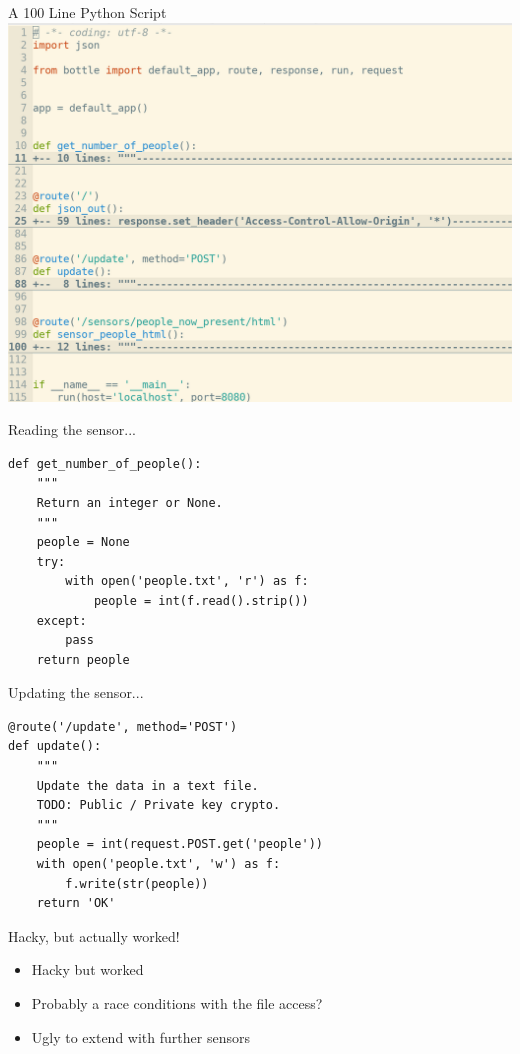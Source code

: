 \begin{frame}[c]{A 100 Line Python Script}
    \centering
    \includegraphics[height=0.98\textheight]{./spaceapi_in_rust/python2.png}
\end{frame}

\begin{frame}[fragile]{Reading the sensor...}
    \begin{verbatim}
def get_number_of_people():
    """
    Return an integer or None.
    """
    people = None
    try:
        with open('people.txt', 'r') as f:
            people = int(f.read().strip())
    except:
        pass
    return people
    \end{verbatim}
\end{frame}

\begin{frame}[fragile]{Updating the sensor...}
    \begin{verbatim}
@route('/update', method='POST')
def update():
    """
    Update the data in a text file.
    TODO: Public / Private key crypto.
    """
    people = int(request.POST.get('people'))
    with open('people.txt', 'w') as f:
        f.write(str(people))
    return 'OK'
    \end{verbatim}
\end{frame}

\begin{frame}[c]{Hacky, but actually worked!}
    \begin{itemize}
        \item Hacky but worked
        \item Probably a race conditions with the file access?
        \item Ugly to extend with further sensors
    \end{itemize}
\end{frame}

